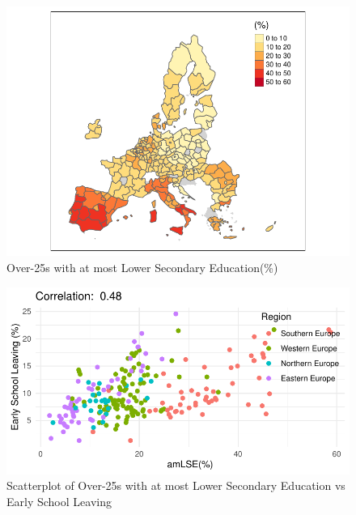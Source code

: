 \documentclass[
  letterpaper,
  DIV=11,
  numbers=noendperiod,
  abstract]{scrartcl}
\begin{document}
\begin{figure}[H]

{\centering \includegraphics[width=1\textwidth,height=\textheight]{report_files/figure-pdf/mappa amLSE-1.pdf}

}

\caption{Over-25s with at most Lower Secondary Education(\%)}

\end{figure}%

\begin{figure}[H]

{\centering \includegraphics[width=1\textwidth,height=\textheight]{report_files/figure-pdf/scatter amLSE-1.pdf}

}

\caption{Scatterplot of Over-25s with at most Lower Secondary Education
vs Early School Leaving}

\end{figure}%
\end{document}
